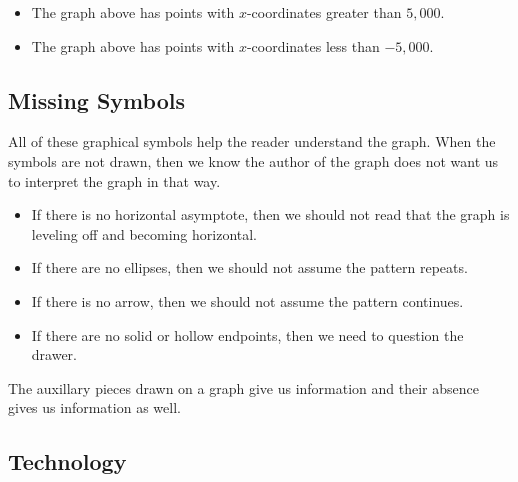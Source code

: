 \documentclass{ximera}
\begin{document}
\begin{question}
\begin{itemize}
\item The graph above has points with $x$-coordinates greater than $5,000$.
\begin{multipleChoice}
\end{multipleChoice}



\item The graph above has points with $x$-coordinates less than $-5,000$.
\begin{multipleChoice}
\end{multipleChoice}
\end{itemize}

\end{question}











\subsection*{Missing Symbols}

All of these graphical symbols help the reader understand the graph.  When the symbols are not drawn, then we know the author of the graph does not want us to interpret the graph in that way.


\begin{itemize}
\item If there is no horizontal asymptote, then we should not read that the graph is leveling off and becoming horizontal.
\item If there are no ellipses, then we should not assume the pattern repeats.
\item If there is no arrow, then we should not assume the pattern continues.
\item If there are no solid or hollow endpoints, then we need to question the drawer.
\end{itemize}



The auxillary pieces drawn on a graph give us information and their absence gives us information as well.









\subsection*{Technology}
\end{document}
